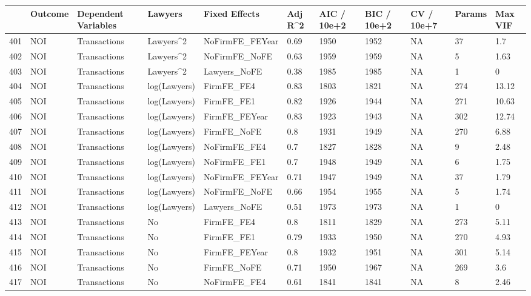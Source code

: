 \documentclass{article}
\begin{document}
\begin{table}[H]
\centering
\begin{tabular}{rllllllllll}
  \hline
 & Outcome & Dependent Variables & Lawyers & Fixed Effects & Adj R^2 & AIC / 10e+2 & BIC / 10e+2 & CV / 10e+7 & Params & Max VIF \\ 
  \hline
401 & NOI & Transactions & Lawyers^2 & NoFirmFE\_FEYear & 0.69 & 1950 & 1952 & NA & 37 & 1.7 \\ 
  402 & NOI & Transactions & Lawyers^2 & NoFirmFE\_NoFE & 0.63 & 1959 & 1959 & NA & 5 & 1.63 \\ 
  403 & NOI & Transactions & Lawyers^2 & Lawyers\_NoFE & 0.38 & 1985 & 1985 & NA & 1 & 0 \\ 
  404 & NOI & Transactions & log(Lawyers) & FirmFE\_FE4 & 0.83 & 1803 & 1821 & NA & 274 & 13.12 \\ 
  405 & NOI & Transactions & log(Lawyers) & FirmFE\_FE1 & 0.82 & 1926 & 1944 & NA & 271 & 10.63 \\ 
  406 & NOI & Transactions & log(Lawyers) & FirmFE\_FEYear & 0.83 & 1923 & 1943 & NA & 302 & 12.74 \\ 
  407 & NOI & Transactions & log(Lawyers) & FirmFE\_NoFE & 0.8 & 1931 & 1949 & NA & 270 & 6.88 \\ 
  408 & NOI & Transactions & log(Lawyers) & NoFirmFE\_FE4 & 0.7 & 1827 & 1828 & NA & 9 & 2.48 \\ 
  409 & NOI & Transactions & log(Lawyers) & NoFirmFE\_FE1 & 0.7 & 1948 & 1949 & NA & 6 & 1.75 \\ 
  410 & NOI & Transactions & log(Lawyers) & NoFirmFE\_FEYear & 0.71 & 1947 & 1949 & NA & 37 & 1.79 \\ 
  411 & NOI & Transactions & log(Lawyers) & NoFirmFE\_NoFE & 0.66 & 1954 & 1955 & NA & 5 & 1.74 \\ 
  412 & NOI & Transactions & log(Lawyers) & Lawyers\_NoFE & 0.51 & 1973 & 1973 & NA & 1 & 0 \\ 
  413 & NOI & Transactions & No & FirmFE\_FE4 & 0.8 & 1811 & 1829 & NA & 273 & 5.11 \\ 
  414 & NOI & Transactions & No & FirmFE\_FE1 & 0.79 & 1933 & 1950 & NA & 270 & 4.93 \\ 
  415 & NOI & Transactions & No & FirmFE\_FEYear & 0.8 & 1932 & 1951 & NA & 301 & 5.14 \\ 
  416 & NOI & Transactions & No & FirmFE\_NoFE & 0.71 & 1950 & 1967 & NA & 269 & 3.6 \\ 
  417 & NOI & Transactions & No & NoFirmFE\_FE4 & 0.61 & 1841 & 1841 & NA & 8 & 2.46 \\ 

\end{tabular}
\end{table}
\end{document}
